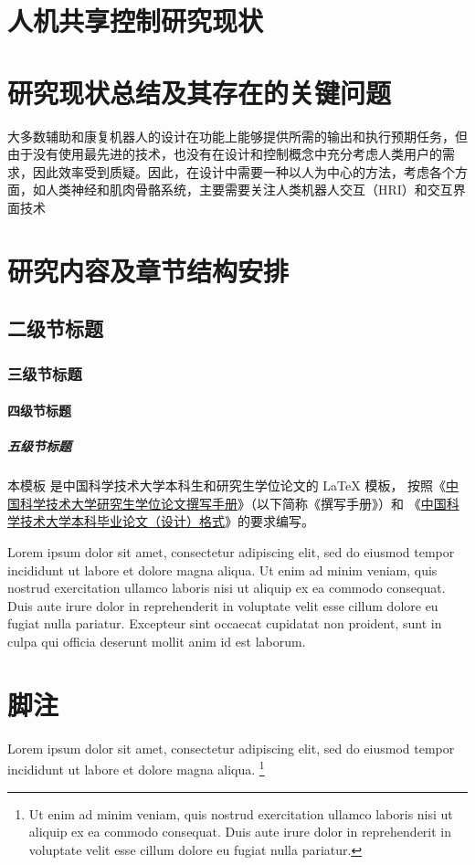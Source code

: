 \section{人机共享控制研究现状}

\section{研究现状总结及其存在的关键问题}
大多数辅助和康复机器人的设计在功能上能够提供所需的输出和执行预期任务，但由于没有使用最先进的技术，也没有在设计和控制概念中充分考虑人类用户的需求，因此效率受到质疑。因此，在设计中需要一种以人为中心的方法，考虑各个方面，如人类神经和肌肉骨骼系统，主要需要关注人类机器人交互（HRI）和交互界面技术

\section{研究内容及章节结构安排}

\subsection{二级节标题}

\subsubsection{三级节标题}

\paragraph{四级节标题}

\subparagraph{五级节标题}

本模板  是中国科学技术大学本科生和研究生学位论文的 \LaTeX{}
模板， 按照《\href{https://gradschool.ustc.edu.cn/static/upload/article/picture/ce3b02e5f0274c90b9331ef50ae1ac26.pdf}
{中国科学技术大学研究生学位论文撰写手册}》（以下简称《撰写手册》）和
《\href{https://www.teach.ustc.edu.cn/?attachment_id=13867}
{中国科学技术大学本科毕业论文（设计）格式}》的要求编写。

Lorem ipsum dolor sit amet, consectetur adipiscing elit, sed do eiusmod tempor
incididunt ut labore et dolore magna aliqua.
Ut enim ad minim veniam, quis nostrud exercitation ullamco laboris nisi ut
aliquip ex ea commodo consequat.
Duis aute irure dolor in reprehenderit in voluptate velit esse cillum dolore eu
fugiat nulla pariatur.
Excepteur sint occaecat cupidatat non proident, sunt in culpa qui officia
deserunt mollit anim id est laborum.



\section{脚注}

Lorem ipsum dolor sit amet, consectetur adipiscing elit, sed do eiusmod tempor
incididunt ut labore et dolore magna aliqua.
\footnote{Ut enim ad minim veniam, quis nostrud exercitation ullamco laboris
  nisi ut aliquip ex ea commodo consequat.
  Duis aute irure dolor in reprehenderit in voluptate velit esse cillum dolore
  eu fugiat nulla pariatur.}
